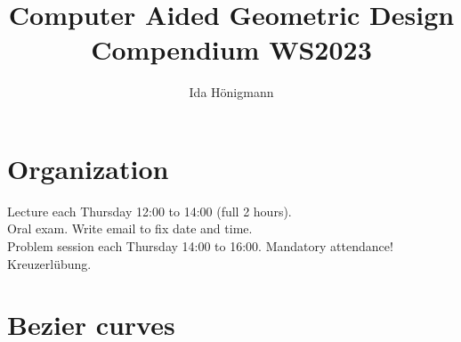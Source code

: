 \documentclass[]{article}
\begin{document}
	
	\title{Computer Aided Geometric Design Compendium WS2023}
	\author{Ida Hönigmann}
	
	\maketitle

\section*{Organization}
Lecture each Thursday 12:00 to 14:00 (full 2 hours).
\\
Oral exam. Write email to fix date and time.
\\
Problem session each Thursday 14:00 to 16:00. Mandatory attendance!
\\
Kreuzerlübung.

\section{Bezier curves}
\end{document}
